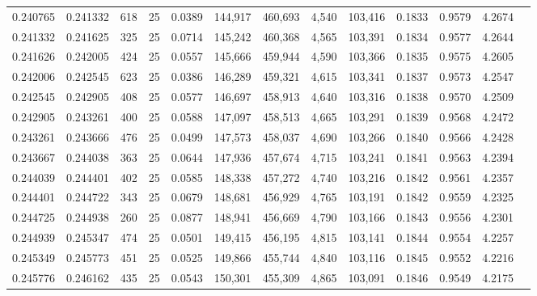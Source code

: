 \begin{tabular}{rrrrrrrrrrrrr}
0.240765 & 0.241332 &   618 &  25 &                                     0.0389 & 144,917 & 460,693 &   4,540 & 103,416 & 0.1833 & 0.9579 & 4.2674 \\
0.241332 & 0.241625 &   325 &  25 &                                     0.0714 & 145,242 & 460,368 &   4,565 & 103,391 & 0.1834 & 0.9577 & 4.2644 \\
0.241626 & 0.242005 &   424 &  25 &                                     0.0557 & 145,666 & 459,944 &   4,590 & 103,366 & 0.1835 & 0.9575 & 4.2605 \\
0.242006 & 0.242545 &   623 &  25 &                                     0.0386 & 146,289 & 459,321 &   4,615 & 103,341 & 0.1837 & 0.9573 & 4.2547 \\
0.242545 & 0.242905 &   408 &  25 &                                     0.0577 & 146,697 & 458,913 &   4,640 & 103,316 & 0.1838 & 0.9570 & 4.2509 \\
0.242905 & 0.243261 &   400 &  25 &                                     0.0588 & 147,097 & 458,513 &   4,665 & 103,291 & 0.1839 & 0.9568 & 4.2472 \\
0.243261 & 0.243666 &   476 &  25 &                                     0.0499 & 147,573 & 458,037 &   4,690 & 103,266 & 0.1840 & 0.9566 & 4.2428 \\
0.243667 & 0.244038 &   363 &  25 &                                     0.0644 & 147,936 & 457,674 &   4,715 & 103,241 & 0.1841 & 0.9563 & 4.2394 \\
0.244039 & 0.244401 &   402 &  25 &                                     0.0585 & 148,338 & 457,272 &   4,740 & 103,216 & 0.1842 & 0.9561 & 4.2357 \\
0.244401 & 0.244722 &   343 &  25 &                                     0.0679 & 148,681 & 456,929 &   4,765 & 103,191 & 0.1842 & 0.9559 & 4.2325 \\
0.244725 & 0.244938 &   260 &  25 &                                     0.0877 & 148,941 & 456,669 &   4,790 & 103,166 & 0.1843 & 0.9556 & 4.2301 \\
0.244939 & 0.245347 &   474 &  25 &                                     0.0501 & 149,415 & 456,195 &   4,815 & 103,141 & 0.1844 & 0.9554 & 4.2257 \\
0.245349 & 0.245773 &   451 &  25 &                                     0.0525 & 149,866 & 455,744 &   4,840 & 103,116 & 0.1845 & 0.9552 & 4.2216 \\
0.245776 & 0.246162 &   435 &  25 &                                     0.0543 & 150,301 & 455,309 &   4,865 & 103,091 & 0.1846 & 0.9549 & 4.2175 \\

\end{tabular}
